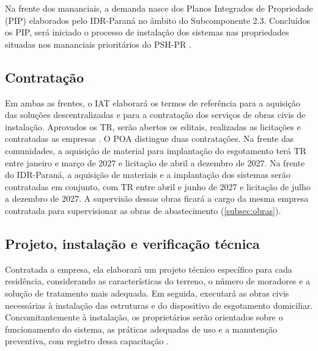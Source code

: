 Na frente dos mananciais, a demanda nasce dos Planos Integrados de Propriedade
(PIP) elaborados pelo IDR-Paraná no âmbito do Subcomponente 2.3. Concluídos os
PIP, será iniciado o processo de instalação dos sistemas nas propriedades
situadas nos mananciais prioritários do PSH-PR \cite{mop2026}.


\subsection{Contratação}
\label{subsec:esgotamento-contratacao}

Em ambas as frentes, o IAT elaborará os termos de referência para a
aquisição das soluções descentralizadas e para a contratação dos serviços de
obras civis de instalação. Aprovados os TR, serão abertos os editais,
realizadas as licitações e contratadas as empresas \cite{mop2026}. O POA
distingue duas contratações. Na frente das comunidades, a aquisição de
material para implantação do esgotamento terá TR entre janeiro e março de
2027 e licitação de abril a dezembro de 2027. Na frente do IDR-Paraná, a
aquisição de materiais e a implantação dos sistemas serão contratadas em
conjunto, com TR entre abril e junho de 2027 e licitação de julho a dezembro de
2027. A supervisão dessas obras ficará a cargo da mesma empresa contratada
para supervisionar as obras de abastecimento (\autoref{subsec:obras}).


\subsection{Projeto, instalação e verificação técnica}
\label{subsec:esgotamento-instalacao}

Contratada a empresa, ela elaborará um projeto técnico específico para cada
residência, considerando as características do terreno, o número de moradores
e a solução de tratamento mais adequada. Em seguida, executará as obras civis
necessárias à instalação das estruturas e do dispositivo de esgotamento
domiciliar. Concomitantemente à instalação, os proprietários serão orientados
sobre o funcionamento do sistema, as práticas adequadas de uso e a manutenção
preventiva, com registro dessa capacitação \cite{mop2026}.

